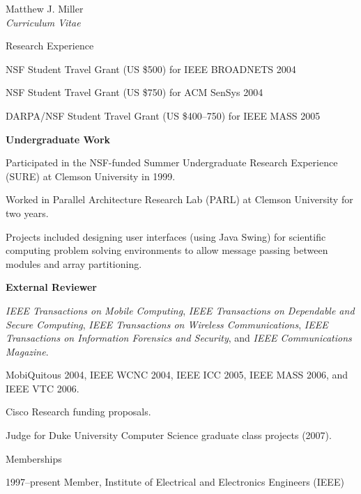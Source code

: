 \documentclass[10pt]{article}
\newenvironment{subbulletlist}{%
    \begin{list}{\labelitemii}{%
        \setlength{\topsep}{\itemsep}\setlength{\parskip}{\parsep}%
    }%
}%
{ \end{list} }
\begin{document}
\begin{cv}{Matthew J. Miller\\{\large \itshape Curriculum Vitae}}
\begin{cvlist}{Research Experience}
\begin{subbulletlist}
        \item NSF Student Travel Grant (US \$500) for IEEE BROADNETS 2004 
        \item NSF Student Travel Grant (US \$750) for ACM SenSys 2004
        \item DARPA/NSF Student Travel Grant (US \$400--750) for IEEE MASS 2005
    \end{subbulletlist}
    \item \textbf{Undergraduate Work}
    \begin{subbulletlist}
        \item Participated in the NSF-funded Summer Undergraduate 
        Research Experience (SURE) at Clemson University in 1999.
        \item Worked in Parallel Architecture Research Lab (PARL) 
        at Clemson University for two years.
        \item Projects included designing user interfaces (using Java Swing)
        for scientific
        computing problem solving environments to allow message passing
        between modules and array partitioning.
    \end{subbulletlist}
    \item \textbf{External Reviewer}
    \begin{subbulletlist}
        \item \textit{IEEE Transactions on Mobile Computing}, 
        \textit{IEEE Transactions on Dependable and 
        Secure Computing}, 
        \textit{IEEE Transactions on Wireless Communications}, 
        \textit{IEEE Transactions on Information Forensics and
        Security}, and \textit{IEEE Communications Magazine}.
        \item MobiQuitous 2004, IEEE WCNC 2004, IEEE ICC 2005, 
        IEEE MASS 2006, and IEEE VTC 2006.
        \item Cisco Research funding proposals.
        \item Judge for Duke University Computer Science
        graduate class projects (2007).
    \end{subbulletlist}
\end{cvlist}
\setlength{\cvlabelwidth}{\oldcvlabelwidth}

\begin{cvlist}{Memberships}
    \item[1997--present] Member, Institute of Electrical and
    Electronics Engineers (IEEE)
\end{cvlist}


\end{cv}
\end{document}
